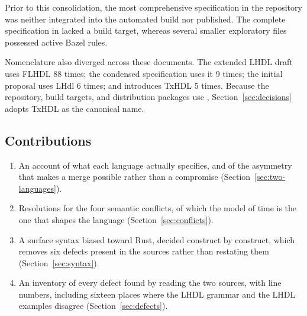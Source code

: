 Prior to this consolidation, the most comprehensive specification in the
repository was neither integrated into the automated build nor published.
The complete specification in  lacked a build target,
whereas several smaller exploratory files possessed active Bazel rules.

Nomenclature also diverged across these documents. The extended LHDL draft
uses FLHDL 88 times; the condensed specification uses it 9 times; the initial
proposal uses LHdl 6 times; and  introduces TxHDL 5
times. Because the repository, build targets, and distribution packages use
, Section~\ref{sec:decisions} adopts TxHDL as the canonical name.

\subsection{Contributions}

\begin{enumerate}
  \item An account of what each language actually specifies, and of the
        asymmetry that makes a merge possible rather than a compromise
        (Section~\ref{sec:two-languages}).
  \item Resolutions for the four semantic conflicts, of which the model of
        time is the one that shapes the language
        (Section~\ref{sec:conflicts}).
  \item A surface syntax biased toward Rust, decided construct by
        construct, which removes six defects present in the sources rather
        than restating them (Section~\ref{sec:syntax}).
  \item An inventory of every defect found by reading the two sources,
        with line numbers, including sixteen places where the LHDL grammar
        and the LHDL examples disagree
        (Section~\ref{sec:defects}).
\end{enumerate}
